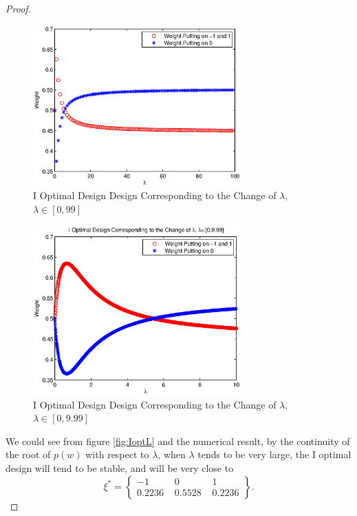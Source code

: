 \documentclass[preprint,12pt]{elsarticle}
\begin{document}
\begin{proof}
\begin{figure}[htpb]
\begin{center}
\includegraphics[width=8cm]{IoptM.eps}
\caption{\label{fig:IoptM} I Optimal Design Design Corresponding to
the Change of $\lambda$, $\lambda\in[0,99]$ }
\end{center}
\end{figure}

\begin{figure}[htpb]
\begin{center}
\includegraphics[width=8cm]{IoptS.eps}
\caption{\label{fig:IoptS} I Optimal Design Design Corresponding to
the Change of $\lambda$, $\lambda\in[0,9.99]$ }
\end{center}
\end{figure}

We could see from figure \ref{fig:IoptL} and the numerical result,
by the continuity of the root of $p(w)$ with respect to $\lambda$,
when $\lambda$ tends to be very large, the I optimal design will
tend to be stable, and will be very close to
$$\xi^*=\left\{\begin{array}{ccc}-1\,\,&0\,\,&1\\0.2236\,\,&0.5528\,\,&0.2236\end{array}\right\}.$$


\end{proof}
\end{document}
